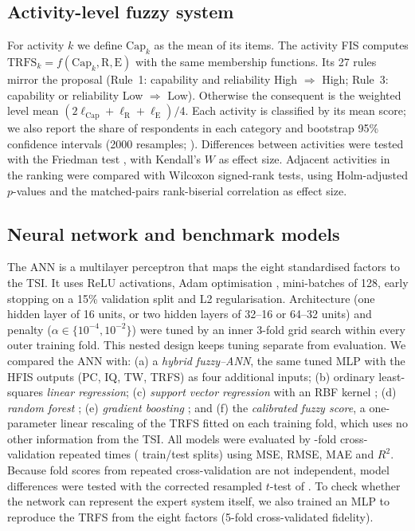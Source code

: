 \documentclass[pdflatex,sn-basic]{sn-jnl}%
\theoremstyle{plain}
\theoremstyle{remark}
\begin{document}
\subsection{Activity-level fuzzy system}
For activity $k$ we define $\mathrm{Cap}_k$ as the mean of its items. The activity FIS computes $\mathrm{TRFS}_k=f(\mathrm{Cap}_k,\mathrm{R},\mathrm{E})$ with the same membership functions. Its 27 rules mirror the proposal (Rule~1: capability and reliability High $\Rightarrow$ High; Rule~3: capability or reliability Low $\Rightarrow$ Low). Otherwise the consequent is the weighted level mean $(2\ell_{\mathrm{Cap}}+\ell_{\mathrm{R}}+\ell_{\mathrm{E}})/4$. Each activity is classified by its mean score; we also report the share of respondents in each category and bootstrap 95\% confidence intervals (2000 resamples; \citealp{efron1993}). Differences between activities were tested with the Friedman test \citep{friedman1937}, with Kendall's $W$ as effect size. Adjacent activities in the ranking were compared with Wilcoxon signed-rank tests, using Holm-adjusted $p$-values \citep{holm1979} and the matched-pairs rank-biserial correlation as effect size.

\subsection{Neural network and benchmark models}
The ANN is a multilayer perceptron \citep{rumelhart1986} that maps the eight standardised factors to the TSI. It uses ReLU activations, Adam optimisation \citep{kingma2015}, mini-batches of 128, early stopping on a 15\% validation split and L2 regularisation. Architecture (one hidden layer of 16 units, or two hidden layers of 32--16 or 64--32 units) and penalty ($\alpha\in\{10^{-4},10^{-2}\}$) were tuned by an inner 3-fold grid search within every outer training fold. This nested design keeps tuning separate from evaluation. We compared the ANN with:
(a) a \emph{hybrid fuzzy--ANN}, the same tuned MLP with the HFIS outputs (PC, IQ, TW, TRFS) as four additional inputs;
(b) ordinary least-squares \emph{linear regression};
(c) \emph{support vector regression} with an RBF kernel \citep{smola2004};
(d) \emph{random forest} \citep{breiman2001};
(e) \emph{gradient boosting} \citep{friedman2001}; and
(f) the \emph{calibrated fuzzy score}, a one-parameter linear rescaling of the TRFS fitted on each training fold, which uses no other information from the TSI.
All models were evaluated by \CVsplits-fold cross-validation repeated \CVrepeats{} times (\CVfits{} train/test splits) using MSE, RMSE, MAE and $R^2$. Because fold scores from repeated cross-validation are not independent, model differences were tested with the corrected resampled $t$-test of \citet{nadeau2003}. To check whether the network can represent the expert system itself, we also trained an MLP to reproduce the TRFS from the eight factors (5-fold cross-validated fidelity).
\end{document}
